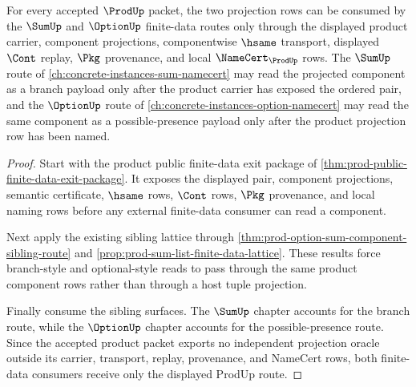\begin{theorem}
\label{thm:prod-sum-projection-route}
For every accepted $\ProdUp$ packet, the two projection rows can be consumed by the $\SumUp$ and $\OptionUp$ finite-data routes only through the displayed product carrier, component projections, componentwise $\hsame$ transport, displayed $\Cont$ replay, $\Pkg$ provenance, and local $\NameCert_{\ProdUp}$ rows. The $\SumUp$ route of \autoref{ch:concrete-instances-sum-namecert} may read the projected component as a branch payload only after the product carrier has exposed the ordered pair, and the $\OptionUp$ route of \autoref{ch:concrete-instances-option-namecert} may read the same component as a possible-presence payload only after the product projection row has been named.
\end{theorem}
\begin{proof}
Start with the product public finite-data exit package of \autoref{thm:prod-public-finite-data-exit-package}. It exposes the displayed pair, component projections, semantic certificate, $\hsame$ rows, $\Cont$ rows, $\Pkg$ provenance, and local naming rows before any external finite-data consumer can read a component.

Next apply the existing sibling lattice through \autoref{thm:prod-option-sum-component-sibling-route} and \autoref{prop:prod-sum-list-finite-data-lattice}. These results force branch-style and optional-style reads to pass through the same product component rows rather than through a host tuple projection.

Finally consume the sibling surfaces. The $\SumUp$ chapter accounts for the branch route, while the $\OptionUp$ chapter accounts for the possible-presence route. Since the accepted product packet exports no independent projection oracle outside its carrier, transport, replay, provenance, and NameCert rows, both finite-data consumers receive only the displayed ProdUp route.
\end{proof}
